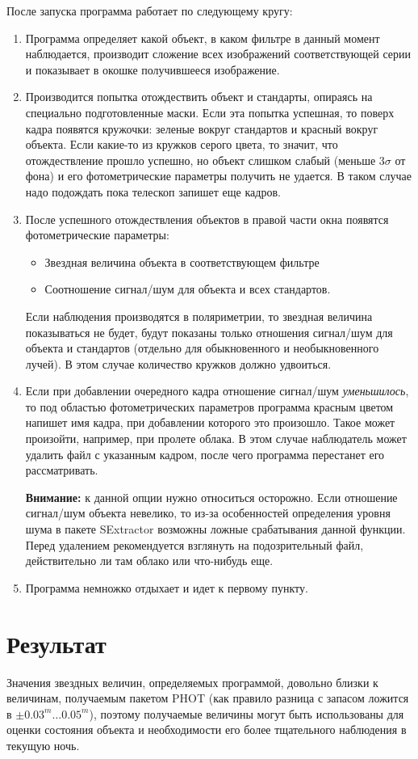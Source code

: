 \documentclass[a4paper,12pt,leqno,notitlepage]{article}
\begin{document}
После запуска программа работает по следующему кругу:
\begin{enumerate}
\item Программа определяет какой объект, в каком фильтре в данный момент наблюдается, производит сложение всех
  изображений соответствующей серии и показывает в окошке получившееся изображение.
\item Производится попытка отождествить объект и стандарты, опираясь на специально подготовленные маски.
  Если эта попытка успешная, то поверх кадра появятся кружочки: зеленые вокруг стандартов и красный
  вокруг объекта. Если какие-то из кружков серого цвета, то значит, что отождествление прошло
  успешно, но объект слишком слабый (меньше $3\sigma$ от фона) и его фотометрические параметры
  получить не удается. В таком случае надо подождать пока телескоп запишет еще кадров.
\item После успешного отождествления объектов в правой части окна появятся фотометрические параметры:
  \begin{itemize}
  \item Звездная величина объекта в соответствующем фильтре
  \item Соотношение сигнал/шум для объекта и всех стандартов.
  \end{itemize}
  Если наблюдения производятся в поляриметрии, то звездная величина показываться не будет,
  будут показаны только отношения сигнал/шум для объекта и стандартов (отдельно для обыкновенного
  и необыкновенного лучей). В этом случае количество кружков должно удвоиться.
\item Если при добавлении очередного кадра отношение сигнал/шум \textit{уменьшилось}, то
  под областью фотометрических параметров программа красным цветом напишет имя кадра, при добавлении
  которого это произошло. Такое может произойти, например, при пролете облака. В этом случае наблюдатель
  может удалить файл с указанным кадром, после чего программа перестанет его рассматривать.

  \textbf{Внимание:} к данной опции нужно относиться осторожно. Если отношение сигнал/шум объекта
  невелико, то из-за особенностей определения уровня шума в пакете SExtractor возможны ложные срабатывания
  данной функции. Перед удалением рекомендуется взглянуть на подозрительный файл, действительно ли там облако
  или что-нибудь еще.
\item Программа немножко отдыхает и идет к первому пункту.
\end{enumerate}


\section{Результат}
Значения звездных величин, определяемых программой, довольно близки к величинам, получаемым пакетом  PHOT
(как правило разница с запасом ложится в $\pm 0.03^m\dots 0.05^m$), поэтому получаемые величины
могут быть использованы для оценки состояния объекта и необходимости его более тщательного наблюдения
в текущую ночь.
\end{document}
